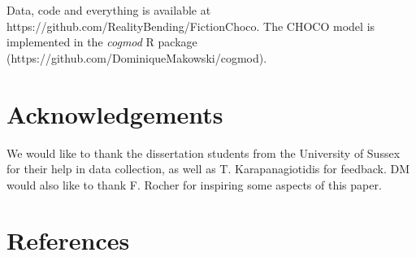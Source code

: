 \documentclass[
  jou,
  floatsintext,
  longtable,
  nolmodern,
  notxfonts,
  notimes,
  colorlinks=true,linkcolor=blue,citecolor=blue,urlcolor=blue]{apa7}
\begin{document}
Data, code and everything is available at
https://github.com/RealityBending/FictionChoco. The CHOCO model is
implemented in the \emph{cogmod} R package
(https://github.com/DominiqueMakowski/cogmod).

\section{Acknowledgements}\label{acknowledgements}

We would like to thank the dissertation students from the University of
Sussex for their help in data collection, as well as T. Karapanagiotidis
for feedback. DM would also like to thank F. Rocher for inspiring some
aspects of this paper.

\section{References}\label{references}
\end{document}
